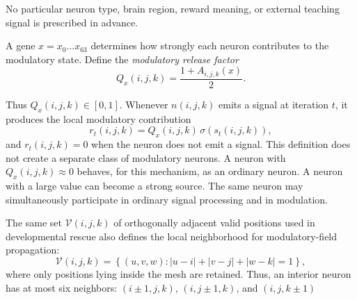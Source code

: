 \documentclass[12pt,a4paper]{article}
\begin{document}
\begin{enumerate}
	No particular neuron type, brain region, reward meaning, or external teaching signal is prescribed in advance.

	A gene $x=x_0\ldots x_{63}$ determines how strongly each neuron contributes to the modulatory state. Define the \emph{modulatory release factor}
	$$Q_x(i, j, k) = \frac{1 + A_{i,j,k}(x)}{2}.$$
	
	Thus $Q_x(i,j,k)\in[0,1]$. Whenever $n(i,j,k)$ emits a signal at iteration $t$, it produces the local modulatory contribution
	$$r_t(i,j,k)=Q_x(i,j,k)\,\sigma\left(s_t(i,j,k)\right),$$
and $r_t(i,j,k)=0$ when the neuron does not emit a signal. This definition does not create a separate class of modulatory neurons. A neuron with $Q_x(i,j,k)\approx0$ behaves, for this mechanism, as an ordinary neuron. A neuron with a large value can become a strong source. The same neuron may simultaneously participate in ordinary signal processing and in modulation.

	The same set $\mathcal{V}(i,j,k)$ of orthogonally adjacent valid positions used in developmental rescue also defines the local neighborhood for modulatory-field propagation:
	$$\mathcal{V}(i,j,k)=\left\{ (u,v,w): |u-i|+|v-j|+|w-k| = 1\right\},$$
where only positions lying inside the mesh are retained. Thus, an interior neuron has at most six neighbors: $(i\pm1,j,k)$, $(i,j\pm1,k)$, and $(i,j,k\pm1)$ 

	\begin{figure}[h]
	\centering
\end{figure}
\end{enumerate}
\end{document}
